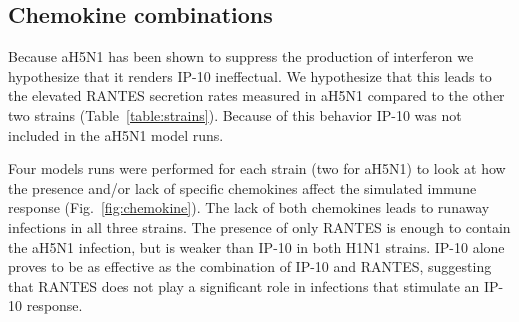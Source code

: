 \documentclass[10pt]{article}
\begin{document}
\subsection*{Chemokine combinations}

Because aH5N1 has been shown to suppress the production of interferon \cite{Mitchell2011} we hypothesize that it renders IP-10 ineffectual.  We hypothesize that this leads to the elevated RANTES secretion rates measured in aH5N1 compared to the other two strains (Table~\ref{table:strains}).  Because of this behavior IP-10 was not included in the aH5N1 model runs.

Four models runs were performed for each strain (two for aH5N1) to look at how the presence and/or lack of specific chemokines affect the simulated immune response (Fig.~\ref{fig:chemokine}).  The lack of both chemokines leads to runaway infections in all three strains.  The presence of only RANTES is enough to contain the aH5N1 infection, but is weaker than IP-10 in both H1N1 strains.  IP-10 alone proves to be as effective as the combination of IP-10 and RANTES, suggesting that RANTES does not play a significant role in infections that stimulate an IP-10 response.
\end{document}
